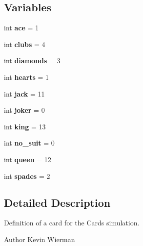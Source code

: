 \subsection*{Variables}
\begin{DoxyCompactItemize}
\item 
\hypertarget{namespaceCard_aa78f383e42b60060507dae2077e8d26e}{int {\bfseries ace} = 1}\label{namespaceCard_aa78f383e42b60060507dae2077e8d26e}

\item 
\hypertarget{namespaceCard_a82d2f841fa195775700bbe74ceb1d906}{int {\bfseries clubs} = 4}\label{namespaceCard_a82d2f841fa195775700bbe74ceb1d906}

\item 
\hypertarget{namespaceCard_a7f376f6efc23ee8fc9be5180d4a81622}{int {\bfseries diamonds} = 3}\label{namespaceCard_a7f376f6efc23ee8fc9be5180d4a81622}

\item 
\hypertarget{namespaceCard_ad0f64d4deb5aef926cb386e8e9ccb0ae}{int {\bfseries hearts} = 1}\label{namespaceCard_ad0f64d4deb5aef926cb386e8e9ccb0ae}

\item 
\hypertarget{namespaceCard_a22500a15ab16181ce089c51d80626f08}{int {\bfseries jack} = 11}\label{namespaceCard_a22500a15ab16181ce089c51d80626f08}

\item 
\hypertarget{namespaceCard_a4a7418c36db6675ee482215e9677f094}{int {\bfseries joker} = 0}\label{namespaceCard_a4a7418c36db6675ee482215e9677f094}

\item 
\hypertarget{namespaceCard_a9905a5554b4a6c69b4b4a525e0f07bf4}{int {\bfseries king} = 13}\label{namespaceCard_a9905a5554b4a6c69b4b4a525e0f07bf4}

\item 
\hypertarget{namespaceCard_ad86bad24519c8112035fbe687e88ed98}{int {\bfseries no\-\_\-suit} = 0}\label{namespaceCard_ad86bad24519c8112035fbe687e88ed98}

\item 
\hypertarget{namespaceCard_a37cd88fc9b0419aff151714ad08f7901}{int {\bfseries queen} = 12}\label{namespaceCard_a37cd88fc9b0419aff151714ad08f7901}

\item 
\hypertarget{namespaceCard_ac90e4550efbeb5311c89af2936d5a449}{int {\bfseries spades} = 2}\label{namespaceCard_ac90e4550efbeb5311c89af2936d5a449}

\end{DoxyCompactItemize}


\subsection{Detailed Description}
Definition of a card for the Cards simulation. \begin{DoxyAuthor}{Author}
Kevin Wierman 
\end{DoxyAuthor}
